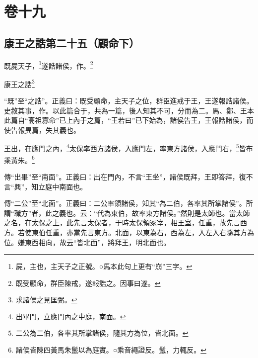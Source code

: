 

\chapter{卷十九}


\section{康王之誥第二十五（顧命下）}


既屍天子，\footnote{屍，主也，主天子之正號。○馬本此句上更有“崩”三字。}遂誥諸侯，作。\footnote{既受顧命，群臣陳戒，遂報誥之。因事曰遂。}

康王之誥\footnote{求諸侯之見匡弼。}

{\noindent\shu{}\fzkt “既”至“之誥”。正義曰：既受顧命，主天子之位，群臣進戒于王，王遂報誥諸侯。史敘其事，作。以此篇合于，共為一篇，後人知其不可，分而為二。馬、鄭、王本此篇自“高祖寡命”已上內于之篇，“王若曰”已下始為，諸侯告王，王報誥諸侯，而使告報異篇，失其義也。 \par}

王出，在應門之內，\footnote{出畢門，立應門內之中庭，南面。}太保率西方諸侯，入應門左，率東方諸侯，入應門右，\footnote{二公為二伯，各率其所掌諸侯，隨其方為位，皆北面。}皆布乘黃朱。\footnote{諸侯皆陳四黃馬朱鬛以為庭實。○乘音繩證反。鬛，力輒反。}


{\noindent\zhuan{}\fzbyks 傳“出畢”至“南面”。正義曰：出在門內，不言“王坐”，諸侯既拜，王即答拜，復不言“興”，知立庭中南面也。 \par}

{\noindent\zhuan{}\fzbyks 傳“二公”至“北面”。正義曰：二公率領諸侯，知其“為二伯，各率其所掌諸侯”。所謂“職方”者，此之義也。云：“代為東伯，故率東方諸侯。”然則是太師也。當太師之名，在太保之上，此先言太保者，于時太保領冢宰，相王室，任重，故先言西方。若使東伯任重，亦當先言東方。北面，以東為右，西為左，入左入右隨其方為位。嫌東西相向，故云“皆北面”，將拜王，明北面也。 \par}

